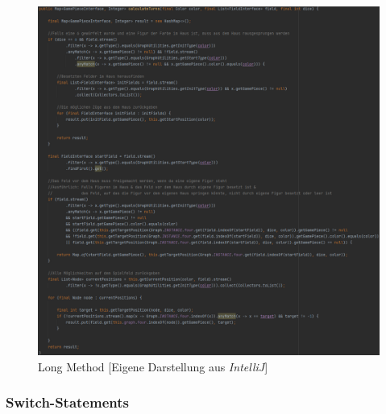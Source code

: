 \begin{figure}[htbp]
\centering
\centerline{\includegraphics[scale=.65]{longmethod}}
\caption{Long Method [Eigene Darstellung aus \emph{IntelliJ}]}
\label{fig:longmethod}
\end{figure}

\newpage

\subsubsection{Switch-Statements}

